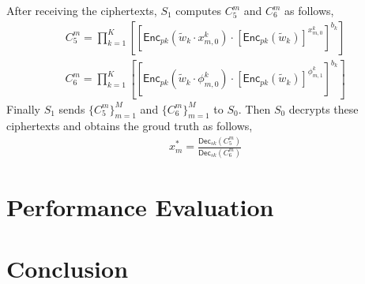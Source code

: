 \documentclass[conference]{IEEEtran}
\begin{document}
After receiving the ciphertexts, $S_1$ computes $C_5^m$ and $C_6^m$ as follows,
\begin{equation}
  \begin{split}
    C_5^m = \prod_{k=1}^K\left[\left[\mathsf{Enc}_{pk}(\tilde{w}_k\cdot x_{m,0}^k)\cdot \left[\mathsf{Enc}_{pk}(\tilde{w}_k)\right]^{x_{m,0}^k}\right]^{b_k} \right]
  \end{split}
\end{equation}
\begin{equation}
  \begin{split}
    C_6^m = \prod_{k=1}^K \left[ \left[ \mathsf{Enc}_{pk}(\tilde{w}_k\cdot \phi_{m,0}^k) \cdot \left[\mathsf{Enc}_{pk}(\tilde{w}_k)\right]^{\phi_{m,1}^k}\right]^{b_k} \right]
  \end{split}
\end{equation}
Finally $S_1$ sends $\{C_5^m\}_{m=1}^M$ and $\{C_6^m\}_{m=1}^M$ to $S_0$.
Then $S_0$ decrypts these ciphertexts and obtains the groud truth as follows,
\begin{equation}
  \begin{split}
    x_m^* = \frac{\mathsf{Dec}_{sk}(C_5^m)}{\mathsf{Dec}_{sk}(C_6^m)}
  \end{split}
\end{equation}

\section{Performance Evaluation}\label{sec6}
\section{Conclusion}\label{sec7}




\vspace{12pt}
\end{document}
